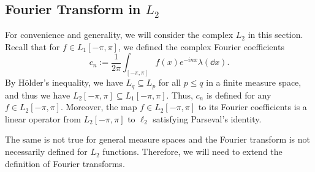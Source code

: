 \documentclass[]{article}
\theoremstyle{definition}
\theoremstyle{definition}
\begin{document}
\subsection{Fourier Transform in \texorpdfstring{\(L_2\)}{Lg}}

For convenience and generality, we will consider the complex \(L_2\) in this 
section. Recall that for \(f \in L_1[-\pi, \pi]\), we defined the complex Fourier 
coefficients 
\[c_n := \frac{1}{2\pi} \int_{[-\pi, \pi]} f(x)e^{-inx} \lambda(\dd x).\]
By Hölder's inequality, we have \(L_q \subseteq L_p\) for all \(p \le q\) 
in a finite measure space, and thus we have 
\(L_2[-\pi, \pi] \subseteq L_1[-\pi, \pi]\). Thus, \(c_n\) is defined for any 
\(f \in L_2[-\pi, \pi]\). Moreover, the map \(f \in L_2[-\pi, \pi]\) to its 
Fourier coefficients 
is a linear operator from \(L_2[-\pi, \pi]\) to \(\ell_2\) satisfying 
Parseval's identity. 

The same is not true for general measure spaces and the Fourier transform is 
not necessarily defined for \(L_2\) functions. Therefore, we will need to extend 
the definition of Fourier transforms.
\end{document}
